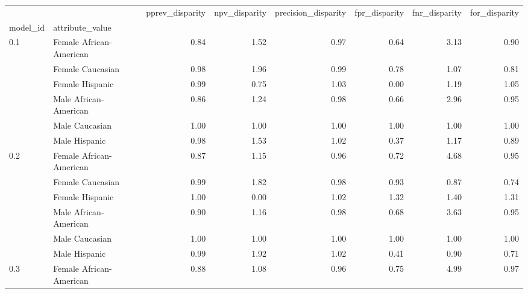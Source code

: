 \begin{tabular}{llrrrrrr}
\toprule
    &               &  pprev\_disparity &  npv\_disparity &  precision\_disparity &  fpr\_disparity &  fnr\_disparity &  for\_disparity \\
model\_id & attribute\_value &                  &                &                      &                &                &                \\
\midrule
0.1 & Female African-American &             0.84 &           1.52 &                 0.97 &           0.64 &           3.13 &           0.90 \\
    & Female Caucasian &             0.98 &           1.96 &                 0.99 &           0.78 &           1.07 &           0.81 \\
    & Female Hispanic &             0.99 &           0.75 &                 1.03 &           0.00 &           1.19 &           1.05 \\
    & Male African-American &             0.86 &           1.24 &                 0.98 &           0.66 &           2.96 &           0.95 \\
    & Male Caucasian &             1.00 &           1.00 &                 1.00 &           1.00 &           1.00 &           1.00 \\
    & Male Hispanic &             0.98 &           1.53 &                 1.02 &           0.37 &           1.17 &           0.89 \\
0.2 & Female African-American &             0.87 &           1.15 &                 0.96 &           0.72 &           4.68 &           0.95 \\
    & Female Caucasian &             0.99 &           1.82 &                 0.98 &           0.93 &           0.87 &           0.74 \\
    & Female Hispanic &             1.00 &           0.00 &                 1.02 &           1.32 &           1.40 &           1.31 \\
    & Male African-American &             0.90 &           1.16 &                 0.98 &           0.68 &           3.63 &           0.95 \\
    & Male Caucasian &             1.00 &           1.00 &                 1.00 &           1.00 &           1.00 &           1.00 \\
    & Male Hispanic &             0.99 &           1.92 &                 1.02 &           0.41 &           0.90 &           0.71 \\
0.3 & Female African-American &             0.88 &           1.08 &                 0.96 &           0.75 &           4.99 &           0.97 \\

\end{tabular}
